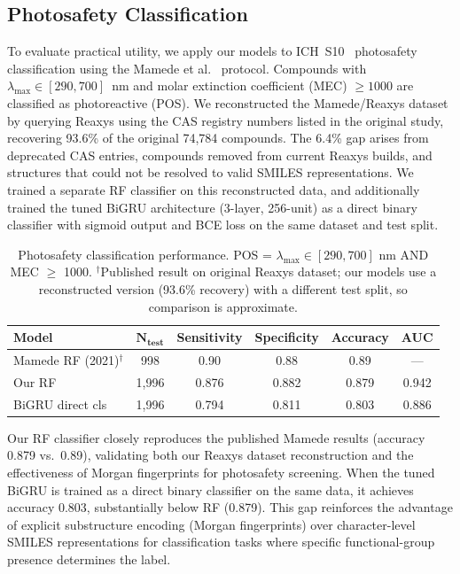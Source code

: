 \documentclass[journal=jcisd8,manuscript=article]{achemso}
\begin{document}
\subsection{Photosafety Classification}
\label{sec:classification}

To evaluate practical utility, we apply our models to ICH~S10~\cite{ICH2013S10} photosafety classification using the Mamede et al.~\cite{mamede2021machine} protocol.
Compounds with $\lambda_{\max} \in [290, 700]$~nm and molar extinction coefficient (MEC) $\geq 1000$ are classified as photoreactive (POS).
We reconstructed the Mamede/Reaxys dataset by querying Reaxys using the CAS registry numbers listed in the original study, recovering 93.6\% of the original 74,784 compounds.
The 6.4\% gap arises from deprecated CAS entries, compounds removed from current Reaxys builds, and structures that could not be resolved to valid SMILES representations.
We trained a separate RF classifier on this reconstructed data, and additionally trained the tuned BiGRU architecture (3-layer, 256-unit) as a direct binary classifier with sigmoid output and BCE loss on the same dataset and test split.

\begin{table}[htbp]
\centering
\caption{Photosafety classification performance. POS = $\lambda_{\max} \in [290,700]$ nm AND MEC $\geq$ 1000. $^\dagger$Published result on original Reaxys dataset; our models use a reconstructed version (93.6\% recovery) with a different test split, so comparison is approximate.}
\label{tab:classification}
\begin{tabular}{lccccc}
\toprule
\textbf{Model} & $\boldsymbol{N_{\text{test}}}$ & \textbf{Sensitivity} & \textbf{Specificity} & \textbf{Accuracy} & \textbf{AUC} \\
\midrule
Mamede RF (2021)$^\dagger$  & 998   & 0.90  & 0.88  & 0.89  & ---   \\
Our RF                      & 1,996 & 0.876 & 0.882 & 0.879 & 0.942 \\
BiGRU direct cls            & 1,996 & 0.794 & 0.811 & 0.803 & 0.886 \\
\bottomrule
\end{tabular}
\end{table}

Our RF classifier closely reproduces the published Mamede results (accuracy 0.879 vs.\ 0.89), validating both our Reaxys dataset reconstruction and the effectiveness of Morgan fingerprints for photosafety screening.
When the tuned BiGRU is trained as a direct binary classifier on the same data, it achieves accuracy 0.803, substantially below RF (0.879).
This gap reinforces the advantage of explicit substructure encoding (Morgan fingerprints) over character-level SMILES representations for classification tasks where specific functional-group presence determines the label.
\end{document}
